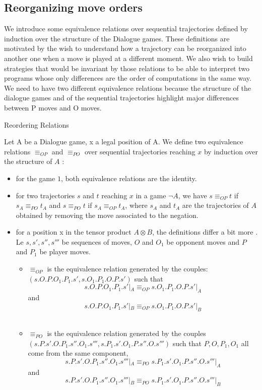 \documentclass[a4paper,UKenglish]{lipics}
\begin{document}
\subsection{Reorganizing move orders}

We introduce some equivalence relations over sequential trajectories defined by induction over the structure of the Dialogue games. These definitions are motivated by the wish to understand how  a trajectory can be reorganized into another one when a move is played at a different moment. We also wish to build strategies that would be invariant by those relations to be able to interpret two programs whose only differences are the order of computations in the same way.\\

 We need to have two different equivalence relations because the structure of the dialogue games and of the sequential trajectories highlight major differences between P moves and O moves.
\begin{definition}{Reordering Relations}

Let A be a Dialogue game, x a legal position of A. We define two equivalence relations $\equiv_{OP}$ and $\equiv_ {PO}$ over sequential trajectories reaching $x$ by induction over the structure of $A$ : 
\begin{itemize}
\item for the game $1$, both equivalence relations are the identity.
\item for two trajectories $s$ and $t$ reaching $x$ in a game $\neg A$, we have $s \equiv_{OP} t$ if $s_A \equiv_{PO} t_A$ and $s \equiv_{PO} t$ if $s_A \equiv_{OP} t_A$, where $s_A$ and $t_A$ are the trajectories of $A$ obtained by removing the move associated to the negation.
 
\item for a position x in the tensor product $A \otimes B$, the definitions differ a bit more . Le $s,s',s'',s'''$ be sequences of moves, $O$ and $O_1$ be opponent moves and $P$ and $P_1$ be player moves. 
\begin{itemize}
\item $\equiv_{OP}$ is the equivalence relation generated by the couples: $(s.O.P.O_1.P_1.s' , s.O_1.P_1.O.P.s')$ such that $$s.O.P.O_1.P_1.s'|_A \equiv_{OP} s.O_1.P_1.O.P.s'|_A$$ and $$s.O.P.O_1.P_1.s'|_B \equiv_{OP} s.O_1.P_1.O.P.s'|_B$$ \\

\item $ \equiv_{PO}$ is the equivalence relation generated by the couples $(s.P.s'.O.P_1.s''.O_1.s''', s.P_1.s'.O_1.P.s''.O.s''')$ such that $P,O,P_1,O_1$ all come from the same component,  $$s.P.s'.O.P_1.s''.O_1.s'''|_A \equiv_{PO} s.P_1.s'.O_1.P.s''.O.s'''|_A$$ and $$s.P.s'.O.P_1.s''.O_1.s'''|_B \equiv_{PO} s.P_1.s'.O_1.P.s''.O.s'''|_B$$\\

\end{itemize}
\end{itemize} 
\end{definition}
\end{document}
